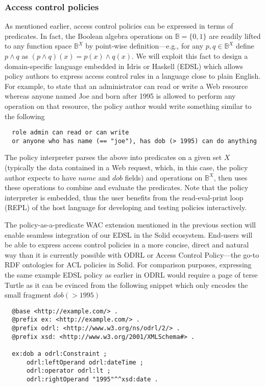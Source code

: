 \subsubsection{Access control policies}
As mentioned earlier, access control policies can be expressed in
terms of predicates. In fact, the Boolean algebra operations on
$\mathbb{B} = \{0,1\}$ are readily lifted to any function space
$\mathbb{B}^X$ by point-wise definition---e.g., for any $p,q \in \mathbb{B}^X$
define $p \wedge q$ as $(p \wedge q)(x) = p(x) \wedge q(x)$. We will
exploit this fact to design a domain-specific language embedded in
Idris or Haskell (EDSL\cite{gibbons2014folding}) which allows policy
authors to express access control rules in a language close to plain
English. For example, to state that an administrator can read or write
a Web resource whereas anyone named Joe and born after 1995 is allowed
to perform any operation on that resource, the policy author would
write something similar to the following
\begin{lstlisting}
  role admin can read or can write
  or anyone who has name (== "joe"), has dob (> 1995) can do anything
\end{lstlisting}
The policy interpreter parses the above into predicates on a given
set $X$ (typically the data contained in a Web request, which, in
this case, the policy author expects to have $name$ and $dob$ fields)
and operations on $\mathbb{B}^X$, then uses these operations to combine
and evaluate the predicates. Note that the policy interpreter is
embedded, thus the user benefits from the read-eval-print loop
(REPL) of the host language for developing and testing policies
interactively.

The policy-as-a-predicate WAC extension mentioned in the previous
section will enable seamless integration of our EDSL in the Solid
ecosystem. End-users will be able to express access control policies
in a more concise, direct and natural way than it is currently possible
with ODRL or Access Control Policy---the go-to RDF ontologies for
ACL policies in Solid. For comparison purposes, expressing the same
example EDSL policy as earlier in ODRL would require a page of terse
Turtle as it can be evinced from the following snippet which only
encodes the small fragment $dob (> 1995)$
\begin{lstlisting}
  @base <http://example.com/> .
  @prefix ex: <http://example.com/> .
  @prefix odrl: <http://www.w3.org/ns/odrl/2/> .
  @prefix xsd: <http://www.w3.org/2001/XMLSchema#> .

  ex:dob a odrl:Constraint ;
      odrl:leftOperand odrl:dateTime ;
      odrl:operator odrl:lt ;
      odrl:rightOperand "1995"^^xsd:date .
\end{lstlisting}
